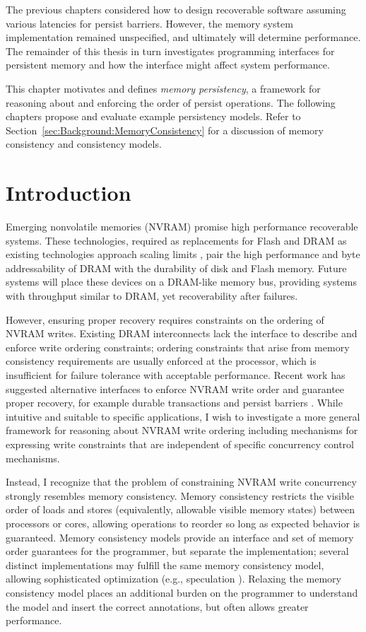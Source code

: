 The previous chapters considered how to design recoverable software assuming various latencies for persist barriers.
However, the memory system implementation remained unspecified, and ultimately will determine performance.
The remainder of this thesis in turn investigates programming interfaces for persistent memory and how the interface might affect system performance.

This chapter motivates and defines \emph{memory persistency}, a framework for reasoning about and enforcing the order of persist operations.
The following chapters propose and evaluate example persistency models.
Refer to Section~\ref{sec:Background:MemoryConsistency} for a discussion of memory consistency and consistency models.

\section{Introduction}
\label{sec:Persistency:Intro}

Emerging nonvolatile memories (NVRAM) promise high performance recoverable systems.
These technologies, required as replacements for Flash and DRAM as existing technologies approach scaling limits \cite{Lee09}, pair the high performance and byte addressability of DRAM with the durability of disk and Flash memory.
Future systems will place these devices on a DRAM-like memory bus, providing systems with throughput similar to DRAM, yet recoverability after failures.

However, ensuring proper recovery requires constraints on the ordering of NVRAM writes.
Existing DRAM interconnects lack the interface to describe and enforce write ordering constraints; ordering constraints that arise from memory consistency requirements are usually enforced at the processor, which is insufficient for failure tolerance with acceptable performance.
Recent work has suggested alternative interfaces to enforce NVRAM write order and guarantee proper recovery, for example durable transactions and persist barriers \cite{Volos11, Condit09}.
While intuitive and suitable to specific applications, I wish to investigate a more general framework for reasoning about NVRAM write ordering including mechanisms for expressing write constraints that are independent of specific concurrency control mechanisms.

Instead, I recognize that the problem of constraining NVRAM write concurrency strongly resembles memory consistency.
Memory consistency restricts the visible order of loads and stores (equivalently, allowable visible memory states) between processors or cores, allowing operations to reorder so long as expected behavior is guaranteed.
Memory consistency models provide an interface and set of memory order guarantees for the programmer, but separate the implementation; several distinct implementations may fulfill the same memory consistency model, allowing sophisticated optimization (e.g., speculation \cite{Blundell09,Wenisch07,Ceze07,Gniady99,Ranganathan97}).
Relaxing the memory consistency model places an additional burden on the programmer to understand the model and insert the correct annotations, but often allows greater performance.

